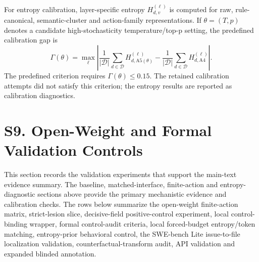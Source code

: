 \documentclass[11pt]{article}
\begin{document}
For entropy calibration, layer-specific entropy \(H^{(\ell)}_{d,v}\) is computed for raw, rule-canonical, semantic-cluster and action-family representations. If \(\theta=(T,p)\) denotes a candidate high-stochasticity temperature/top-p setting, the predefined calibration gap is
\begin{equation}
\Gamma(\theta)=\max_{\ell}\left|\frac{1}{|\mathcal{D}|}\sum_{d\in\mathcal{D}}H^{(\ell)}_{d,\mathrm{A5}(\theta)}-\frac{1}{|\mathcal{D}|}\sum_{d\in\mathcal{D}}H^{(\ell)}_{d,\mathrm{A4}}\right|.
\end{equation}
The predefined criterion requires \(\Gamma(\theta)\leq 0.15\). The retained calibration attempts did not satisfy this criterion; the entropy results are reported as calibration diagnostics.

\clearpage
\section*{S9. Open-Weight and Formal Validation Controls}

This section records the validation experiments that support the main-text evidence summary. The baseline, matched-interface, finite-action and entropy-diagnostic sections above provide the primary mechanistic evidence and calibration checks. The rows below summarize the open-weight finite-action matrix, strict-lesion slice, decisive-field positive-control experiment, local control-binding wrapper, formal control-audit criteria, local forced-budget entropy/token matching, entropy-prior behavioral control, the SWE-bench Lite issue-to-file localization validation, counterfactual-transform audit, API validation and expanded blinded annotation.
\end{document}
